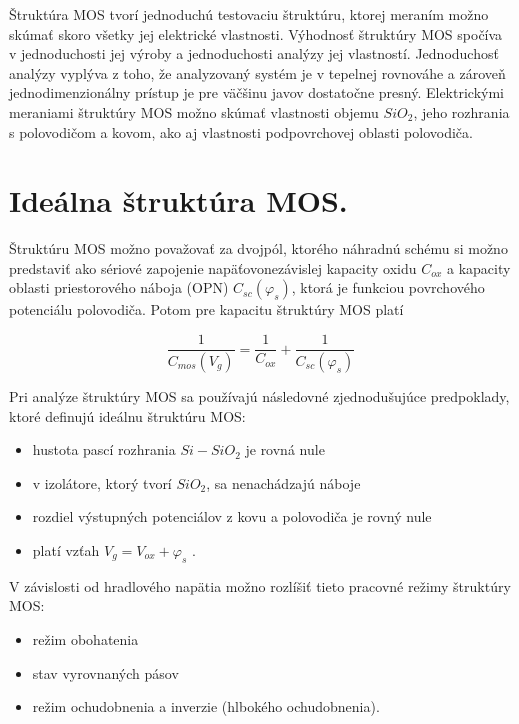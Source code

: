 Štruktúra MOS tvorí jednoduchú testovaciu štruktúru, ktorej meraním
možno skúmať skoro všetky jej elektrické vlastnosti. Výhodnosť
štruktúry MOS spočíva v jednoduchosti jej výroby a jednoduchosti
analýzy jej vlastností. Jednoduchosť analýzy vyplýva z toho, že
analyzovaný systém je v tepelnej rovnováhe a zároveň
jednodimenzionálny prístup je pre väčšinu javov dostatočne
presný. Elektrickými meraniami štruktúry MOS možno skúmať vlastnosti
objemu $SiO_2$, jeho rozhrania s polovodičom a kovom, ako aj
vlastnosti podpovrchovej oblasti polovodiča.

\section{Ideálna štruktúra MOS.}  

Štruktúru MOS možno považovať za dvojpól, ktorého náhradnú schému si
možno predstaviť ako sériové zapojenie napäťovonezávislej kapacity
oxidu $C_{ox}$ a kapacity oblasti priestorového náboja (OPN)
$C_{sc}(\varphi_{s})$, ktorá je funkciou povrchového potenciálu
polovodiča. Potom pre kapacitu štruktúry MOS platí \cite{I.1}

\begin{equation}\label{eq:1.1}
\frac{1}{C_{mos}(V_g)} = \frac{1}{C_{ox}} + \frac{1}{C_{sc}(\varphi_s)}
\end{equation}

Pri analýze štruktúry MOS sa používajú následovné zjednodušujúce
predpoklady, ktoré definujú ideálnu štruktúru MOS:

\begin{itemize}
\item hustota pascí rozhrania $Si-SiO_2$ je rovná nule 
\item v izolátore, ktorý tvorí $SiO_2$, sa nenachádzajú náboje 
\item rozdiel výstupných potenciálov z kovu a polovodiča je rovný nule
\item platí vzťah $V_{g}=V_{ox}+\varphi_{s}$  .
\end{itemize}

\noindent V závislosti od hradlového napätia možno rozlíšiť tieto
pracovné režimy štruktúry MOS:

\begin{itemize}
\item režim obohatenia
\item stav vyrovnaných pásov
\item režim ochudobnenia a inverzie (hlbokého ochudobnenia).
\end{itemize}

